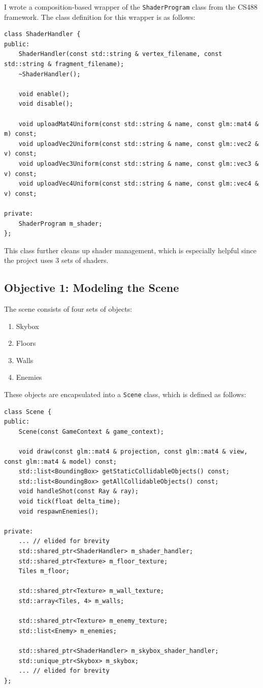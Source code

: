 \documentclass {article}
\begin{document}
I wrote a composition-based wrapper of the \texttt{ShaderProgram} class from the CS488 framework. The class definition for this wrapper is as follows:
\begin{verbatim}
class ShaderHandler {
public:
    ShaderHandler(const std::string & vertex_filename, const std::string & fragment_filename);
    ~ShaderHandler();

    void enable();
    void disable();

    void uploadMat4Uniform(const std::string & name, const glm::mat4 & m) const;
    void uploadVec2Uniform(const std::string & name, const glm::vec2 & v) const;
    void uploadVec3Uniform(const std::string & name, const glm::vec3 & v) const;
    void uploadVec4Uniform(const std::string & name, const glm::vec4 & v) const;

private:
    ShaderProgram m_shader;
};
\end{verbatim}

This class further cleans up shader management, which is especially helpful since the project uses 3 sets of shaders.

\subsection{Objective 1: Modeling the Scene}\label{sec:modelscene}
The scene consists of four sets of objects:
\begin{enumerate}
  \item Skybox
  \item Floors
  \item Walls
  \item Enemies
\end{enumerate}

These objects are encapsulated into a \texttt{Scene} class, which is defined as follows:
\begin{verbatim}
class Scene {
public:
    Scene(const GameContext & game_context);

    void draw(const glm::mat4 & projection, const glm::mat4 & view, const glm::mat4 & model) const;
    std::list<BoundingBox> getStaticCollidableObjects() const;
    std::list<BoundingBox> getAllCollidableObjects() const;
    void handleShot(const Ray & ray);
    void tick(float delta_time);
    void respawnEnemies();

private:
    ... // elided for brevity
    std::shared_ptr<ShaderHandler> m_shader_handler;
    std::shared_ptr<Texture> m_floor_texture;
    Tiles m_floor;

    std::shared_ptr<Texture> m_wall_texture;
    std::array<Tiles, 4> m_walls;

    std::shared_ptr<Texture> m_enemy_texture;
    std::list<Enemy> m_enemies;

    std::shared_ptr<ShaderHandler> m_skybox_shader_handler;
    std::unique_ptr<Skybox> m_skybox;
    ... // elided for brevity
};
\end{verbatim}
\end{document}
